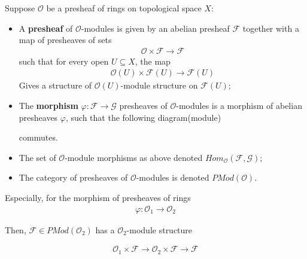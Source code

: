 \documentclass[Total.tex]{subfiles}
\begin{document}
				\begin{Def}
					Suppose $\mathcal{O}$ be a presheaf of rings on topological space $X$:
					\begin{itemize}
						\item A \textbf{presheaf} of $\mathcal{O}$-modules is given by an abelian presheaf $\mathcal{F}$ together with a map of presheaves of sets
						\begin{gather*}
							\mathcal{O}\times \mathcal{F}\rightarrow \mathcal{F}
						\end{gather*}
						such that for every open $U\subseteq X$, the map
						\begin{gather*}
							\mathcal{O}(U)\times \mathcal{F}(U)\rightarrow \mathcal{F}(U)
						\end{gather*}
						Gives a structure of $\mathcal{O}(U)$-module structure on $\mathcal{F}(U)$;
						\item The \textbf{morphism} $\varphi:\mathcal{F}\rightarrow\mathcal{G}$ presheaves of $\mathcal{O}$-modules is a morphism of abelian presheaves $\varphi$, such that the following diagram(module)
						\begin{center}
						\end{center}
						commutes.
						\item The set of $\mathcal{O}$-module morphisms as above denoted $Hom_\mathcal{O}(\mathcal{F},\mathcal{G})$;
						
						\item The category of presheaves of $\mathcal{O}$-modules is denoted $PMod(\mathcal{O})$.
					\end{itemize}
				\end{Def}
				
				
				Especially, for the morphism of presheaves of rings
				\begin{gather*}
					\varphi:\mathcal{O}_1\rightarrow \mathcal{O}_2
				\end{gather*}
				
				Then, $\mathcal{F}\in PMod(\mathcal{O}_2)$ has a $\mathcal{O}_2$-module structure
				
				\begin{gather*}
					\mathcal{O}_1\times \mathcal{F}\rightarrow \mathcal{O}_2\times \mathcal{F}\rightarrow \mathcal{F}
				\end{gather*}
				
\end{document}
